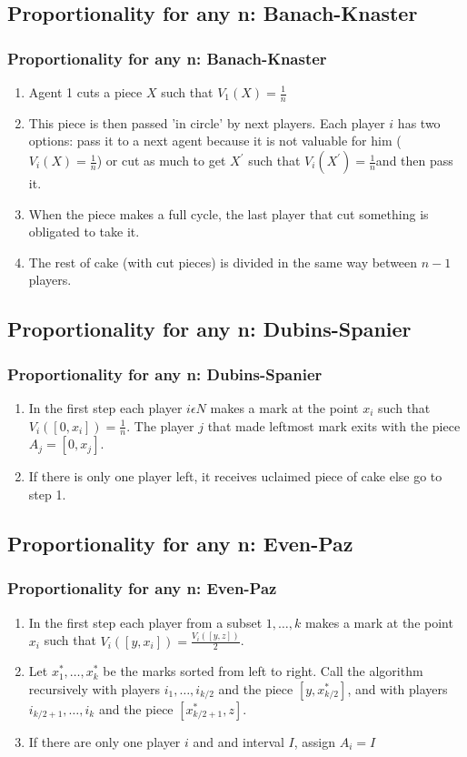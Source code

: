 \documentclass{beamer}
\begin{document}
\subsection{Proportionality for any n: Banach-Knaster}
\begin{frame}
\frametitle{Proportionality for any n: Banach-Knaster}
\begin{enumerate}
\item Agent 1 cuts a piece $X$ such that $V_1(X)=\frac{1}{n}$
\item This piece is then passed 'in circle' by next players. Each player $i$ has two options: pass it to a next agent because it is not valuable for him ($V_i(X)=\frac{1}{n}$) or cut as much to get $X^{'}$ such that $V_i(X^{'})=\frac{1}{n}$and then pass it.
\item When the piece makes a full cycle, the last player that cut something is obligated to take it. 
\item The rest of cake (with cut pieces) is divided in the same way between $n-1$ players.
\end{enumerate}
\end{frame}

\subsection{Proportionality for any n: Dubins-Spanier}
\begin{frame}
\frametitle{Proportionality for any n: Dubins-Spanier}
\begin{enumerate}
    \item In the first step each player $i\epsilon{N}$ makes a mark at the point $x_i$ such that $V_{i}([0,x_i])=\frac{1}{n}$. The player $j$ that made leftmost mark exits with the piece $A_j=[0, x_j]$.
    \item If there is only one player left, it receives uclaimed piece of cake else go to step 1.
\end{enumerate}
\end{frame}

\subsection{Proportionality for any n: Even-Paz}
\begin{frame}
\frametitle{Proportionality for any n: Even-Paz}
\begin{enumerate}
    \item In the first step each player from a subset ${1,\dots,k}$ makes a mark at the point $x_i$ such that $V_{i}([y,x_i])=\frac{V_{i}([y,z])}{2}$. 
    \item Let $x_1^*,\dots,x_k^*$ be the marks sorted from left to right. Call the algorithm recursively with players $i_{1},\dots,i_{k/2}$ and the piece $[y,x_{k/2}^*]$, and with players $i_{k/2+1},\dots,i_{k}$ and the piece $[x_{k/2+1}^{*},z]$.
    \item If there are only one player $i$ and and interval $I$, assign $A_{i}=I$ 
\end{enumerate}

\end{frame}
\end{document}
